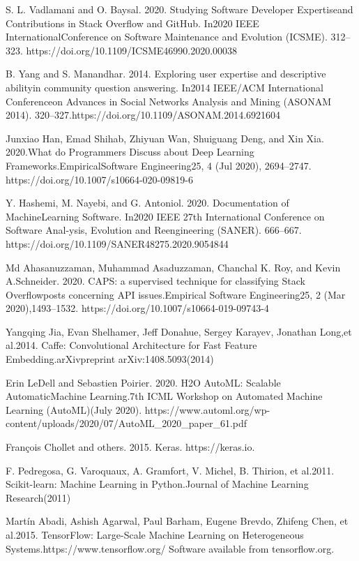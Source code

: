 \documentclass[conference]{IEEEtran}
\begin{document}
\begin{thebibliography}{00}
 S. L. Vadlamani and O. Baysal. 2020. Studying Software Developer Expertiseand Contributions in Stack Overflow and GitHub. In2020 IEEE InternationalConference on Software Maintenance and Evolution (ICSME). 312–323.    https://doi.org/10.1109/ICSME46990.2020.00038

 B. Yang and S. Manandhar. 2014. Exploring user expertise and descriptive abilityin community question answering. In2014 IEEE/ACM International Conferenceon Advances in Social Networks Analysis and Mining (ASONAM 2014). 320–327.https://doi.org/10.1109/ASONAM.2014.6921604

 Junxiao Han, Emad Shihab, Zhiyuan Wan, Shuiguang Deng, and Xin Xia. 2020.What do Programmers Discuss about Deep Learning Frameworks.EmpiricalSoftware Engineering25, 4 (Jul 2020), 2694–2747. https://doi.org/10.1007/s10664-020-09819-6

 Y. Hashemi, M. Nayebi, and G. Antoniol. 2020. Documentation of MachineLearning Software. In2020 IEEE 27th International Conference on Software Anal-ysis, Evolution and Reengineering (SANER). 666–667.   https://doi.org/10.1109/SANER48275.2020.9054844

 Md Ahasanuzzaman, Muhammad Asaduzzaman, Chanchal K. Roy, and Kevin A.Schneider. 2020. CAPS: a supervised technique for classifying Stack Overflowposts concerning API issues.Empirical Software Engineering25, 2 (Mar 2020),1493–1532.   https://doi.org/10.1007/s10664-019-09743-4

 Yangqing Jia, Evan Shelhamer, Jeff Donahue, Sergey Karayev, Jonathan Long,et al.2014. Caffe: Convolutional Architecture for Fast Feature Embedding.arXivpreprint arXiv:1408.5093(2014)

 Erin LeDell and Sebastien Poirier. 2020. H2O AutoML: Scalable AutomaticMachine Learning.7th ICML Workshop on Automated Machine Learning (AutoML)(July 2020).    https://www.automl.org/wp-content/uploads/2020/07/AutoML\_2020\_paper\_61.pdf

 François Chollet and others. 2015. Keras. https://keras.io.

 F. Pedregosa, G. Varoquaux, A. Gramfort, V. Michel, B. Thirion, et al.2011. Scikit-learn: Machine Learning in Python.Journal of Machine Learning Research(2011)

 Martín Abadi, Ashish Agarwal, Paul Barham, Eugene Brevdo, Zhifeng Chen, et al.2015.  TensorFlow: Large-Scale Machine Learning on Heterogeneous Systems.https://www.tensorflow.org/ Software available from tensorflow.org.


\end{thebibliography}
\end{document}

